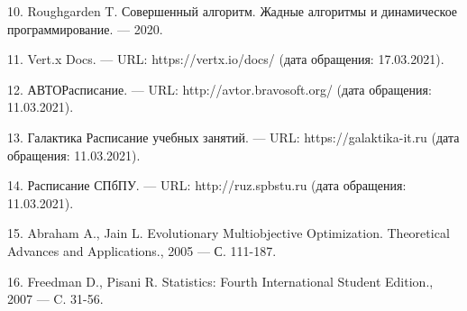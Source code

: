 10. Roughgarden T. Совершенный алгоритм. Жадные алгоритмы и динамическое программирование. — 2020.

11. Vert.x Docs. — URL: https://vertx.io/docs/ (дата обращения: 17.03.2021). 

12. АВТОРасписание. — URL: http://avtor.bravosoft.org/ (дата обращения:
11.03.2021).

13. Галактика Расписание учебных занятий. — URL: https://galaktika-it.ru
(дата обращения: 11.03.2021).

14. Расписание СПбПУ. — URL: http://ruz.spbstu.ru (дата обращения:
11.03.2021).

15. Abraham A., Jain L. Evolutionary Multiobjective Optimization. Theoretical
Advances and Applications., 2005 — С. 111-187.

16. Freedman D., Pisani R. Statistics: Fourth International Student Edition., 2007  — C. 31-56.



